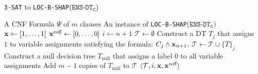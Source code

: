 %
\begin{algorithm}
\caption{\texttt{3-SAT} to \texttt{LOC-B-SHAP}($\texttt{ENS-DT}_{\texttt{C}}$)}
\label{alg:SAT2b-SHAP}
\begin{algorithmic}[1]
\REQUIRE A CNF Formula $\Psi$ of $m$ clauses %
\ENSURE An instance of \texttt{LOC-B-SHAP}($\texttt{ENS-DT}_{\texttt{C}}$)
\STATE $\textbf{x} \leftarrow [1, \ldots , 1]$
\STATE $\textbf{x}^{\text{reff}} \leftarrow [0, \ldots , 0]$
\STATE $i \leftarrow n+1$
\STATE $\mathcal{T} \leftarrow \emptyset$
 \STATE Construct a DT $T_{j}$ that assigns $1$ to variable assignments satisfying the formula: $C_{j} \land \textbf{x}_{n+1}$.
 \STATE $\mathcal{T} \leftarrow \mathcal{T} \cup \{T\}_{j}$
\ENDFOR
 \STATE Construct a null decision tree $T_{\text{null}}$ that assigns a label $0$ to all variable assignments
 \STATE Add $m-1$ copies of $T_{\text{null}}$ to $\mathcal{T}$
\RETURN $\langle\mathcal{T},i,\textbf{x},\textbf{x}^{\text{reff}}\rangle$
\end{algorithmic}
\end{algorithm}



